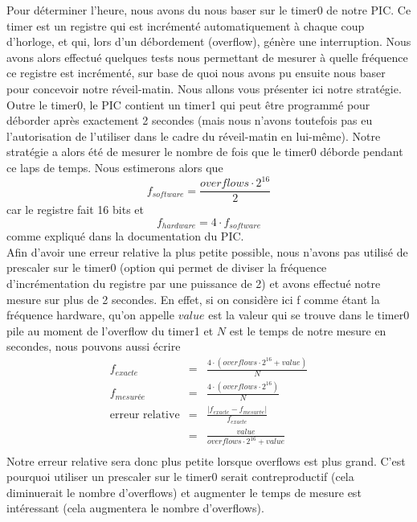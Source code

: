 \documentclass[12pt,a4paper]{article}
\begin{document}
    Pour déterminer l'heure, nous avons du nous baser sur le timer0 de notre PIC. Ce timer est un registre qui est incrémenté automatiquement à chaque coup d'horloge, et qui, lors d'un débordement (overflow), génère une interruption. Nous avons alors effectué quelques tests nous permettant de mesurer à quelle fréquence ce registre est incrémenté, sur base de quoi nous avons pu ensuite nous baser pour concevoir notre réveil-matin. Nous allons vous présenter ici notre stratégie.\\
  
 Outre le timer0, le PIC contient un timer1 qui peut être programmé pour déborder après exactement 2 secondes (mais nous n'avons toutefois pas eu l'autorisation de l'utiliser dans le cadre du réveil-matin en lui-même).  Notre stratégie a alors été de mesurer le nombre de fois que le timer0 déborde pendant ce laps de temps. Nous estimerons alors que $$f_{software} = \frac{overflows \cdot 2^{16}}{2}$$ car le registre fait 16 bits et $$f_{hardware} = 4 \cdot f_{software}$$ comme expliqué dans la documentation du PIC.\\
 
 Afin d'avoir une erreur relative la plus petite possible, nous n'avons pas utilisé de prescaler sur le timer0 (option qui permet de diviser la fréquence d'incrémentation du registre par une puissance de 2) et avons effectué notre mesure sur plus de 2 secondes. En effet, si on considère ici f comme étant la fréquence hardware, qu'on appelle $value$ est la valeur qui se trouve dans le timer0 pile au moment de l'overflow du timer1 et $N$ est le temps de notre mesure en secondes, nous pouvons aussi écrire
 \begin{eqnarray*}
 f_{exacte} &=& \frac{4 \cdot (overflows \cdot 2^{16} + value)}{N}\\
f_{mesurée} &=&  \frac{4 \cdot (overflows \cdot 2^{16})}{N}\\
 \text{erreur relative} &=& \frac{|f_{exacte} - f_{mesurée}|}{f_{exacte}}\\
                      &=& \frac{value}{overflows \cdot 2^{16} + value}\\
\end{eqnarray*}
 Notre erreur relative sera donc plus petite lorsque overflows est plus grand. C'est pourquoi utiliser un prescaler sur le timer0 serait contreproductif (cela diminuerait le nombre d'overflows) et augmenter le temps de mesure est intéressant (cela augmentera le nombre d'overflows).\\
 
\end{document}
